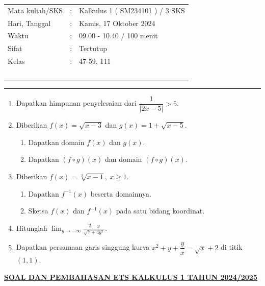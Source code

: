 \documentclass[10pt,openany,a4paper]{article}
\theoremstyle{definition}
\theoremstyle{definition}
\theoremstyle{plain}
\begin{document}
    \begin{center}
	\begin{tabular}{lcl}
		Mata kuliah/SKS & : & Kalkulus 1 ( SM234101 ) / 3 SKS\\
		Hari, Tanggal & : & Kamis, 17 Oktober 2024\\
		Waktu & : & 09.00 - 10.40 / 100 menit\\
		Sifat & : & Tertutup\\
		Kelas & : & 47-59, 111\\
  ~
	\end{tabular}

    \noindent\rule{\textwidth}{2.pt}
        \end{center}
    \begin{enumerate}
    \item Dapatkan himpunan penyelesaian dari $\dfrac{1}{|2x-5|}>5$.

    \item Diberikan $f(x)=\sqrt{x-3}$ dan $g(x)=1+\sqrt{x-5}$.
    \begin{enumerate}
        \item Dapatkan domain $f(x)$ dan $g(x)$.
        \item Dapatkan $(f\circ g)(x)$ dan domain $(f\circ g)(x)$.
    \end{enumerate}

    \item Diberikan $f(x)=\sqrt[3]{x-1},\ x\geq 1$.
    \begin{enumerate}
        \item Dapatkan $f^{-1}(x)$ beserta domainnya.
        \item Sketsa $f(x)$ dan $f^{-1}(x)$ pada satu bidang koordinat.
    \end{enumerate}

    \item Hitunglah $\displaystyle\lim_{y\to-\infty}\frac{2-y}{\sqrt{7+4y^2}}$.

    \item Dapatkan persamaan garis singgung kurva $x^2+y+\dfrac{y}{x}=\sqrt{x}+2$ di titik $(1,1)$.
\end{enumerate}
\newpage
 \begin{center}
	{\underline{\textbf{\MakeUppercase{Soal dan Pembahasan ETS Kalkulus 1 Tahun 2024/2025}}}}
    \end{center}
\end{document}
